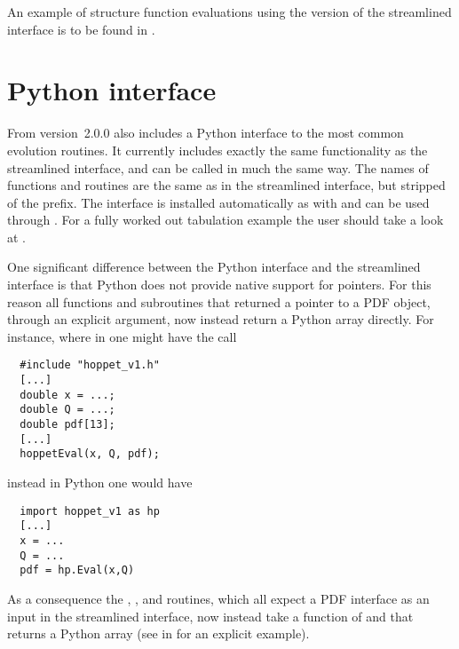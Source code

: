 An example of structure function evaluations using the \CPP{} version of
the streamlined interface is to be found in
.
%

\section{Python interface}
From version~2.0.0 \hoppet also includes a Python interface to the
most common evolution routines. It currently includes exactly the same
functionality as the streamlined interface, and can be called in much
the same way. The names of functions and routines are the same as in
the streamlined interface, but stripped of the 
prefix. The interface is installed automatically as 
with  and can be used through . For a
fully worked out tabulation example the user should take a look at
.

One significant difference between the Python interface and the
streamlined interface is that Python does not provide native support
for pointers. For this reason all functions and subroutines that
returned a pointer to a PDF object, through an explicit argument, now
instead return a Python array directly. For instance, where in \CPP{}
one might have the call
%
\begin{lstlisting}
  #include "hoppet_v1.h"
  [...]
  double x = ...;
  double Q = ...;
  double pdf[13];
  [...]
  hoppetEval(x, Q, pdf);
\end{lstlisting}
%
instead in Python one would have
%
\begin{lstlisting}
  import hoppet_v1 as hp
  [...]
  x = ...
  Q = ...
  pdf = hp.Eval(x,Q)
\end{lstlisting}
As a consequence the , , and
 routines, which all expect a PDF interface as an input in
the streamlined interface, now instead take a function of  and
 that returns a Python array (see  in
for an explicit example).

 	

